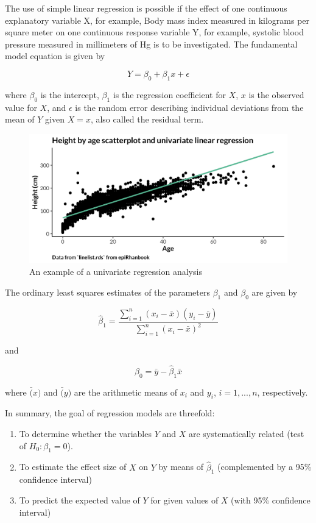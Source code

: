 \documentclass[
]{book}
\providecommand{\tightlist}{%
  \setlength{\itemsep}{0pt}\setlength{\parskip}{0pt}}
\begin{document}
The use of simple linear regression is possible if the effect of one continuous explanatory variable X, for example, Body mass index measured in kilograms per square meter on one continuous response variable Y, for example, systolic blood pressure measured in millimeters of Hg is to be investigated. The fundamental model equation is given by

\[
Y = \beta_0 + \beta_1x + \epsilon
\]

where \(\beta_0\) is the intercept, \(\beta_1\) is the regression coefficient for \(X\), \(x\) is the observed value for \(X\), and \(\epsilon\) is the random error describing individual deviations from the mean of \(Y\) given \(X=x\), also called the residual term.

\begin{figure}

{\centering \includegraphics[width=1\linewidth]{img/regression/univariate_regression} 

}

\caption{An example of a univariate regression analysis}\label{fig:unnamed-chunk-25}
\end{figure}

The ordinary least squares estimates of the parameters \(\beta_1\) and \(\beta_0\) are given by

\[
\hat{\beta}_1 = \frac{\sum_{i=1}^{n} (x_i-\bar{x})(y_i-\bar{y})}{\sum_{i=1}^{n} (x_i-\bar{x})^2}
\]

and

\[
\beta_0 = \bar{y}-\hat{\beta}_1\bar{x}
\]

where \(\bar(x)\) and \(\bar(y)\) are the arithmetic means of \(x_i\) and \(y_i\), \(i=1,...,n\), respectively.

In summary, the goal of regression models are threefold:

\begin{enumerate}
\def\labelenumi{\arabic{enumi}.}
\tightlist
\item
  To determine whether the variables \(Y\) and \(X\) are systematically related (test of \(H_0:\beta_1=0\)).
\item
  To estimate the effect size of \(X\) on \(Y\) by means of \(\hat{\beta}_1\) (complemented by a 95\% confidence interval)
\item
  To predict the expected value of \(Y\) for given values of \(X\) (with 95\% confidence interval)
\end{enumerate}
\end{document}
